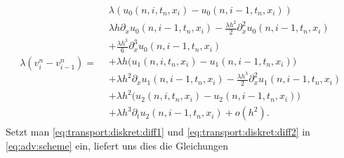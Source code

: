 { 
\begin{align} \label{eq:transport:diskret:diff2}
\lambda (v^n_i - v^n_{i-1}) =
\begin{split}
& \lambda( u_0(n, i, t_n, x_i) - u_0(n, i-1, t_n, x_i) )\\
&\lambda h \partial_x u_0(n, i-1, t_n, x_i) - \frac {\lambda h^2}{2} \partial^2_x u_0(n, i-1, t_n, x_i)\\
& + \frac {\lambda h^3}{6} \partial^3_x u_0(n, i-1, t_n, x_i)\\
&+ \lambda h \bigl( u_1(n, i, t_n, x_i) - u_1(n, i-1, t_n, x_i) \bigr)\\
&+ \lambda h^2 \partial_x u_1(n, i-1, t_n, x_i) - \frac {\lambda h^3}{2} \partial^2_x u_1(n, i-1, t_n, x_i)\\
&+ \lambda h^2 \bigl( u_2(n, i, t_n, x_i) - u_2(n, i-1, t_n, x_i) \bigr)\\
&+ \lambda h^3 \partial_t u_2(n, i-1, t_n, x_i) + o(h^2).
\end{split}
\end{align}
}
\noindent
Setzt man \eqref{eq:transport:diskret:diff1} und \eqref{eq:transport:diskret:diff2} in \eqref{eq:adv:scheme} ein, liefert uns dies die Gleichungen

